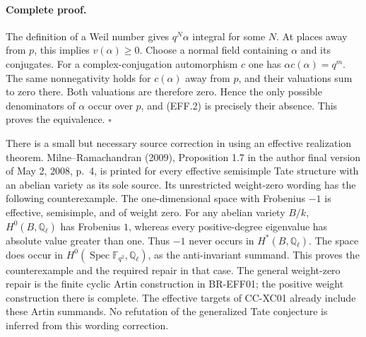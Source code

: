 \documentclass[11pt,a4paper]{article}
\theoremstyle{definition}\newtheorem{definition}[theorem]{Definition}
\theoremstyle{remark}\newtheorem{remark}[theorem]{Remark}
\begin{document}
\paragraph{Complete proof.}
The definition of a Weil number gives $q^N\alpha$ integral for
some $N$.  At places away from $p$, this implies $v(\alpha)\geq0$.
Choose a normal field containing $\alpha$ and its conjugates.
For a complex-conjugation automorphism $c$ one has
$\alpha c(\alpha)=q^m$.  The same nonnegativity holds for
$c(\alpha)$ away from $p$, and their valuations sum to zero
there.  Both valuations are therefore zero.  Hence the only
possible denominators of $\alpha$ occur over $p$, and (EFF.2)
is precisely their absence.  This proves the equivalence.
\(\square\)

There is a small but necessary source correction in using an
effective realization theorem.  Milne--Ramachandran (2009),
Proposition 1.7 in the author final version of May 2, 2008,
p.~4, is printed for every effective semisimple Tate structure
with an abelian variety as its sole source.  Its unrestricted
weight-zero wording has the following counterexample.
The one-dimensional space with Frobenius $-1$ is effective,
semisimple, and of weight zero.  For any abelian variety $B/k$,
$H^0(B,\mathbb Q_\ell)$ has Frobenius $1$, whereas every
positive-degree eigenvalue has absolute value greater than one.
Thus $-1$ never occurs in $H^*(B,\mathbb Q_\ell)$.
The space does occur in
$H^0(\operatorname{Spec}\mathbb F_{q^2},\mathbb Q_\ell)$, as
the anti-invariant summand.  This proves the counterexample and
the required repair in that case.  The general weight-zero repair
is the finite cyclic Artin construction in BR-EFF01; the positive
weight construction there is complete.  The effective targets of
CC-XC01 already include these Artin summands.  No refutation of
the generalized Tate conjecture is inferred from this wording
correction.
\end{document}
